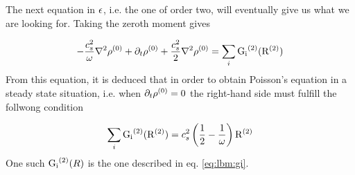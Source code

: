 The next equation in $\epsilon$, i.e. the one of order two, will
eventually give us what we are looking for. Taking the zeroth moment
gives

\begin{equation}
-\frac{c_s^2}{\omega} \nabla^2 \rho^{(0)} + \partial_t \rho^{(0)} +
\frac{c_s^2}{2}\nabla^2 \rho^{(0)} = \sum_i \mathrm{G_i}^{(2)}(\mathrm{\mathrm{R}}^{(2)})
\end{equation}
From this equation, it is deduced that in order to obtain Poisson's
equation in a steady state situation, i.e. when $\partial_t \rho^{(0)} =
0$ the right-hand side must fulfill the follwong condition

\begin{equation}
\sum_i \mathrm{G_i}^{(2)}(\mathrm{\mathrm{R}}^{(2)}) = c_s^2\left( \frac{1}{2} - \frac{1}{\omega} \right)\mathrm{\mathrm{R}}^{(2)}
\end{equation}
One such $\mathrm{G_i}^{(2)}(R)$ is the one described in eq. \eqref{eq:lbm:gi}. 
